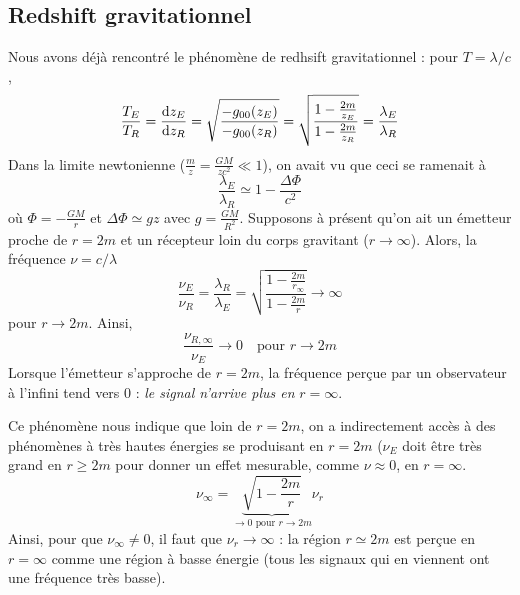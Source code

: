 \subsection{Redshift gravitationnel}
Nous avons déjà rencontré le phénomène de redhsift gravitationnel : pour $T = \lambda/c$,
\begin{equation}
    \frac{T_E}{T_R} = \frac{\mathrm{d} z_E}{\mathrm{d} z_R} = \sqrt{\frac{-g_{00}(z_E)}{-g_{00}(z_R)}} = \sqrt{\frac{1 - \frac{2m}{z_E}}{1 - \frac{2m}{z_R}}} = \frac{\lambda_E}{\lambda_R}
\end{equation}
Dans la limite newtonienne ($\frac{m}{z} = \frac{GM}{zc^2} \ll 1$), on avait vu que ceci se ramenait à
\begin{equation}
    \frac{\lambda_E}{\lambda_R} \simeq 1 - \frac{\Delta \Phi}{c^2}
\end{equation}
où $\Phi = - \frac{GM}{r}$ et $\Delta \Phi \simeq gz$ avec $g = \frac{GM}{R^2}$. Supposons à présent qu'on ait un émetteur proche de $r = 2m$ et un récepteur loin du corps gravitant ($r\to \infty$). Alors, la fréquence $\nu = c/\lambda$ 
\begin{equation}
    \frac{\nu_E}{\nu_R} = \frac{\lambda_R}{\lambda_E} = \sqrt{\frac{1 - \frac{2m}{r_\infty}}{1 - \frac{2m}{r}}} \to \infty
\end{equation}
pour $r \to 2m$. Ainsi, 
\begin{equation}
    \label{TN: signal vers infini}
    \boxed{\frac{\nu_{R,\infty}}{\nu_E} \to 0 \quad \text{pour } r \to 2m}
\end{equation}
Lorsque l'émetteur s'approche de $r=2m$, la fréquence perçue par un observateur à l'infini tend vers 0 : \emph{le signal n'arrive plus en} $r = \infty$.
\begin{rmk}
Ce phénomène nous indique que loin de $r=2m$, on a indirectement accès à des phénomènes à très hautes énergies se produisant en $r = 2m$ ($\nu_E$ doit être très grand en $r \geq 2m$ pour donner un effet mesurable, comme $\nu \approx 0$, en $r = \infty$.
\begin{equation}
    \nu_\infty
    = \underbrace{\sqrt{1 - \frac{2m}{r}}}_{\to 0 \text{ pour } r \to 2m} \nu_r
 \end{equation}
Ainsi, pour que $\nu_\infty \neq 0$, il faut que $\nu_r \to \infty$ : la région $r \simeq 2m$ est perçue en $r=\infty$ comme une région à basse énergie (tous les signaux qui en viennent ont une fréquence très basse).
\end{rmk}

